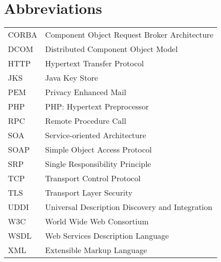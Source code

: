 
\chapter*{Abbreviations}

\begin{tabular}{p{20mm}p{120mm}}

  CORBA & Component Object Request Broker Architecture \\
  DCOM & Distributed Component Object Model \\
  HTTP & Hypertext Transfer Protocol \\
  JKS & Java Key Store \\
  PEM & Privacy Enhanced Mail \\
  PHP & PHP: Hypertext Preprocessor \\
  RPC & Remote Procedure Call \\
  SOA & Service-oriented Architecture \\
  SOAP & Simple Object Access Protocol \\
  SRP & Single Responsibility Principle \\
  TCP & Transport Control Protocol \\
  TLS & Transport Layer Security\\
  UDDI & Universal Description Discovery and Integration \\
  W3C & World Wide Web Consortium \\
  WSDL & Web Services Description Language \\
  XML & Extensible Markup Language \\

\end{tabular}
